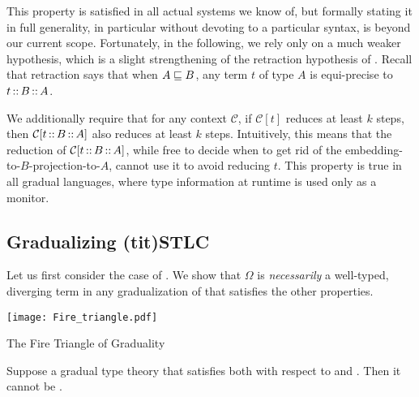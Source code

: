 This property is satisfied in all actual systems we know of,
but formally stating it in full generality, in particular without devoting
to a particular syntax, is beyond our current scope.
Fortunately, in the following, we rely only on a much weaker hypothesis,
which is a slight strengthening of the retraction hypothesis of .
Recall that retraction says that when $A \sqsubseteq B$, any term $t$ of type $A$
is equi-precise to $t \operatorname{\mathord{:}:} B \operatorname{\mathord{:}:} A$.

We additionally require that for any context $\mathcal{C}$, if $\mathcal{C}[t]$
reduces at least $k$ steps, then $\mathcal{C}[t \operatorname{\mathord{:}:} B \operatorname{\mathord{:}:} A]$ also reduces at
least $k$ steps.
Intuitively, this means that the reduction of $\mathcal{C}[t \operatorname{\mathord{:}:} B \operatorname{\mathord{:}:} A]$,
while free to decide when to get rid of the embedding-to-$B$-projection-to-$A$,
cannot use it to avoid reducing $t$.
This property is true in all gradual languages,
where type information at runtime is used only as a monitor.

\subsection{Gradualizing \kl(tit){STLC}}
Let us first consider the case of .
We show that $\Omega$ is \emph{necessarily} a well-typed, diverging term in any
gradualization of  that satisfies the other properties.

\pagebreak

\begin{marginfigure}
  \texttt{[image: Fire\_triangle.pdf]}
  \caption{The Fire Triangle of Graduality}
\end{marginfigure}

\begin{theorem}
  \label{thm:triangle-STLC}

Suppose a gradual type theory that satisfies both  with respect to
 and . Then it cannot be .

\end{theorem}

